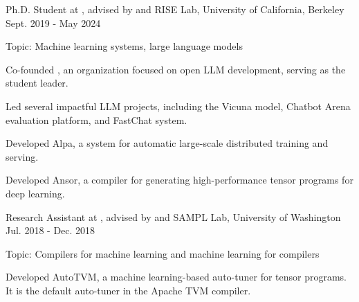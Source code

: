 

\begin{cventries}


\cventry
	{Ph.D. Student at , advised by 
     and
    } %
	{RISE Lab, University of California, Berkeley} %
	{Sept. 2019 - May 2024} %
	{} %
	{
		\begin{cvitems} %
			\item{Topic: Machine learning systems, large language models}
			\item{Co-founded , an organization focused on open LLM development, serving as the student leader.}
			\item{Led several impactful LLM projects, including the Vicuna model, Chatbot Arena evaluation platform, and FastChat system.}
			\item{Developed Alpa, a system for automatic large-scale distributed training and serving.}
			\item{Developed Ansor, a compiler for generating high-performance tensor programs for deep learning.}
		\end{cvitems}
	}


\cventry
	{Research Assistant at , advised by  and } %
	{SAMPL Lab, University of Washington} %
	{Jul. 2018 - Dec. 2018} %
	{} %
	{
		\begin{cvitems} %
			\item{Topic: Compilers for machine learning and machine learning for compilers}
			\item{Developed AutoTVM, a machine learning-based auto-tuner for tensor programs. It is the default auto-tuner in the Apache TVM compiler.}
		\end{cvitems}
	}


\end{cventries}
